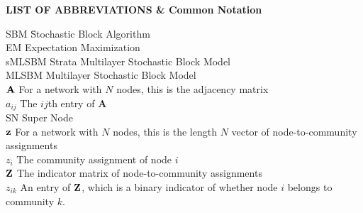 {}

\begin{center}
{\Large \textbf{LIST OF ABBREVIATIONS \& Common Notation}}
\end{center}

\newcommand{\Ab}[2]{\noindent  #1 \> #2 \\}
\newcommand{\Abi}[2]{\noindent #1 \hspace{1.5cm} \= #2 \\}

\begin{tabbing}
\Abi{SBM}{Stochastic Block Algorithm}
\Ab{EM}{Expectation Maximization}
\Ab{sMLSBM}{Strata Multilayer Stochastic Block Model}
\Ab{MLSBM}{Multilayer Stochastic Block Model}
\Ab{${\bf A}$}{For a network with $N$ nodes, this is the adjacency matrix}
\Ab{$a_{ij}$}{The $ij$th entry of {\bf A}}
\Ab{SN}{Super Node}
\Ab{${\bf z}$}{For a network with $N$ nodes, this is the length $N$ vector of node-to-community assignments}
\Ab{$z_{i}$}{The community assignment of node $i$}
\Ab{${\bf Z}$}{The indicator matrix of node-to-community assignments}
\Ab{$z_{ik}$}{An entry of ${\bf Z}$, which is a binary indicator of whether node $i$ belongs to community $k$.}
\end{tabbing}

\clearpage

